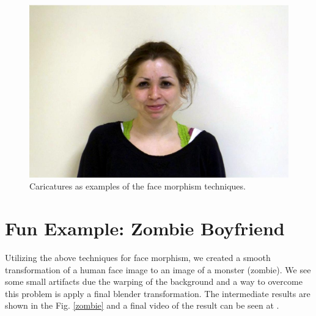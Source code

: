 \documentclass[11pt]{article}
\begin{document}
\begin{figure}[H]
\begin{center}
\includegraphics[scale=0.17]{figs/caricatures/fun_14.jpg}
    
\caption{Caricatures as examples of the face morphism techniques.}
\label{mean-me}
\end{center}
\end{figure}

\newpage

\section{Fun Example: Zombie Boyfriend}

Utilizing the above techniques for face morphism, we created a smooth transformation of a human face image to an image of  a monster (zombie). We see some small artifacts due the warping of the background and a way to overcome this problem is apply a final blender transformation. The intermediate results are shown in the Fig. \ref{zombie} and a final video of the result can be seen at \cite{video-zombie}.

\quad
\end{document}
